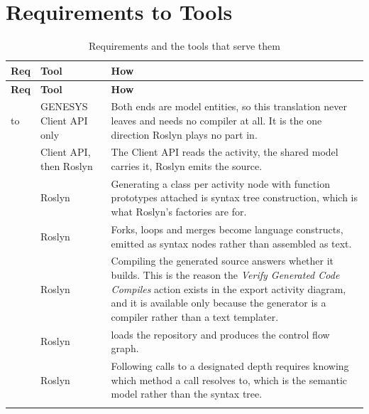 \section{Requirements to Tools}

\begin{longtable}{L{0.14\textwidth}L{0.33\textwidth}L{0.43\textwidth}}
	\caption{Requirements and the tools that serve them}\label{tab:req-tools}\\
	\toprule
	\textbf{Req} & \textbf{Tool} & \textbf{How} \\
	\midrule
	\endfirsthead
	\toprule
	\textbf{Req} & \textbf{Tool} & \textbf{How} \\
	\midrule
	\endhead

	 to  & GENESYS Client API only & Both ends are model
	entities, so this translation never leaves  and needs
	no compiler at all. It is the one direction Roslyn plays no part in. \\
	\addlinespace

	 & Client API, then Roslyn & The Client API reads the activity, the
	shared model carries it, Roslyn emits the source. \\
	\addlinespace

	 & Roslyn & Generating a class per activity node with function
	prototypes attached is syntax tree construction, which is what Roslyn's
	factories are for. \\
	\addlinespace

	 & Roslyn & Forks, loops and merges become language constructs,
	emitted as syntax nodes rather than assembled as text. \\
	\addlinespace

	 & Roslyn & Compiling the generated source answers whether it
	builds. This is the reason the \emph{Verify Generated Code Compiles} action
	exists in the export activity diagram, and it is available only because the
	generator is a compiler rather than a text templater. \\
	\addlinespace

	 & Roslyn &  loads the repository and
	 produces the control flow graph. \\
	\addlinespace

	 & Roslyn & Following calls to a designated depth requires knowing
	which method a call resolves to, which is the semantic model rather than the
	syntax tree. \\
	\addlinespace


\end{longtable}
